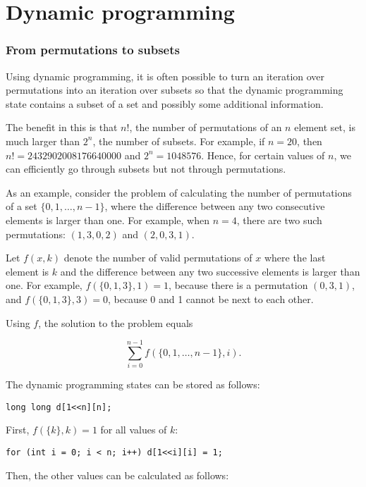 \section{Dynamic programming}

\subsubsection{From permutations to subsets}

Using dynamic programming, it is often possible
to turn an iteration over permutations into
an iteration over subsets so that
the dynamic programming state
contains a subset of a set and possibly
some additional information.

The benefit in this is that
$n!$, the number of permutations of an $n$ element set,
is much larger than $2^n$, the number of subsets.
For example, if $n=20$, then
$n!=2432902008176640000$ and $2^n=1048576$.
Hence, for certain values of $n$,
we can efficiently go through subsets but not through permutations.

As an example, consider the problem of
calculating the number of
permutations of a set $\{0,1,\ldots,n-1\}$,
where the difference between any two consecutive
elements is larger than one.
For example, when $n=4$, there are two such permutations:
$(1,3,0,2)$ and $(2,0,3,1)$.

Let $f(x,k)$ denote the number of valid permutations
of $x$ where the last element is $k$ and
the difference between any two successive
elements is larger than one.
For example, $f(\{0,1,3\},1)=1$,
because there is a permutation $(0,3,1)$,
and $f(\{0,1,3\},3)=0$, because 0 and 1
cannot be next to each other.

Using $f$, the solution to the problem equals

\[ \sum_{i=0}^{n-1} f(\{0,1,\ldots,n-1\},i). \]

\noindent
The dynamic programming states can be stored as follows:

\begin{lstlisting}
long long d[1<<n][n];
\end{lstlisting}

\noindent
First, $f(\{k\},k)=1$ for all values of $k$:

\begin{lstlisting}
for (int i = 0; i < n; i++) d[1<<i][i] = 1;
\end{lstlisting}

\noindent
Then, the other values can be calculated
as follows:

